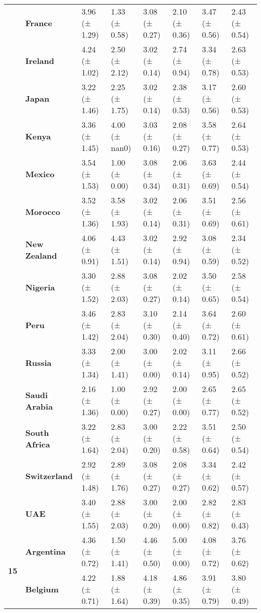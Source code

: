 \begin{longtable}{llllllll}
\textbf{} & \textbf{France} & 3.96 (± 1.29) & 1.33 (± 0.58) & 3.08 (± 0.27) & 2.10 (± 0.36) & 3.47 (± 0.56) & 2.43 (± 0.54) \\
\textbf{} & \textbf{Ireland} & 4.24 (± 1.02) & 2.50 (± 2.12) & 3.02 (± 0.14) & 2.74 (± 0.94) & 3.34 (± 0.78) & 2.63 (± 0.53) \\
\textbf{} & \textbf{Japan} & 3.22 (± 1.46) & 2.25 (± 1.75) & 3.02 (± 0.14) & 2.38 (± 0.53) & 3.17 (± 0.56) & 2.60 (± 0.53) \\
\textbf{} & \textbf{Kenya} & 3.36 (± 1.45) & 4.00 (± nan0) & 3.03 (± 0.16) & 2.08 (± 0.27) & 3.58 (± 0.77) & 2.64 (± 0.53) \\
\textbf{} & \textbf{Mexico} & 3.54 (± 1.53) & 1.00 (± 0.00) & 3.08 (± 0.34) & 2.06 (± 0.31) & 3.63 (± 0.69) & 2.44 (± 0.54) \\
\textbf{} & \textbf{Morocco} & 3.52 (± 1.36) & 3.58 (± 1.93) & 3.02 (± 0.14) & 2.06 (± 0.31) & 3.51 (± 0.69) & 2.56 (± 0.61) \\
\textbf{} & \textbf{New Zealand} & 4.06 (± 0.91) & 4.43 (± 1.51) & 3.02 (± 0.14) & 2.92 (± 0.94) & 3.08 (± 0.59) & 2.34 (± 0.52) \\
\textbf{} & \textbf{Nigeria} & 3.30 (± 1.52) & 2.88 (± 2.03) & 3.08 (± 0.27) & 2.02 (± 0.14) & 3.50 (± 0.65) & 2.58 (± 0.54) \\
\textbf{} & \textbf{Peru} & 3.46 (± 1.42) & 2.83 (± 2.04) & 3.10 (± 0.30) & 2.14 (± 0.40) & 3.64 (± 0.72) & 2.60 (± 0.61) \\
\textbf{} & \textbf{Russia} & 3.33 (± 1.34) & 2.00 (± 1.41) & 3.00 (± 0.00) & 2.02 (± 0.14) & 3.11 (± 0.95) & 2.66 (± 0.52) \\
\textbf{} & \textbf{Saudi Arabia} & 2.16 (± 1.36) & 1.00 (± 0.00) & 2.92 (± 0.27) & 2.00 (± 0.00) & 2.65 (± 0.77) & 2.65 (± 0.52) \\
\textbf{} & \textbf{South Africa} & 3.22 (± 1.64) & 2.83 (± 2.04) & 3.00 (± 0.20) & 2.22 (± 0.58) & 3.51 (± 0.64) & 2.50 (± 0.54) \\
\textbf{} & \textbf{Switzerland} & 2.92 (± 1.48) & 2.89 (± 1.76) & 3.08 (± 0.27) & 2.08 (± 0.27) & 3.34 (± 0.62) & 2.42 (± 0.57) \\
\textbf{} & \textbf{UAE} & 3.40 (± 1.55) & 2.88 (± 2.03) & 3.00 (± 0.20) & 2.00 (± 0.00) & 2.82 (± 0.82) & 2.83 (± 0.43) \\
\cline{1-8}
\multirow[t]{19}{*}{\textbf{15}} & \textbf{Argentina} & 4.36 (± 0.72) & 1.50 (± 1.41) & 4.46 (± 0.50) & 5.00 (± 0.00) & 4.08 (± 0.72) & 3.76 (± 0.62) \\
\textbf{} & \textbf{Belgium} & 4.22 (± 0.71) & 1.88 (± 1.64) & 4.18 (± 0.39) & 4.86 (± 0.35) & 3.91 (± 0.79) & 3.80 (± 0.49) \\

\end{longtable}
